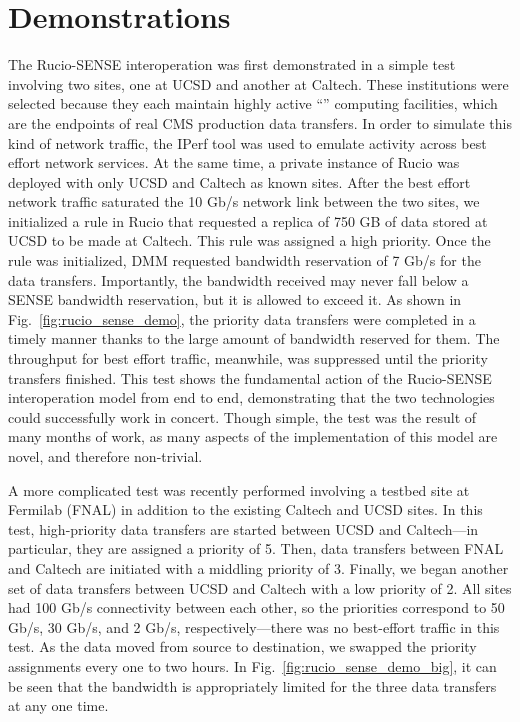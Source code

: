 \section{Demonstrations}
The Rucio-SENSE interoperation was first demonstrated in a simple test involving two sites, one at UCSD and another at Caltech. 
These institutions were selected because they each maintain highly active ``'' computing facilities, which are the endpoints of real CMS production data transfers. 
In order to simulate this kind of network traffic, the IPerf tool was used to emulate activity across best effort network services. 
At the same time, a private instance of Rucio was deployed with only UCSD and Caltech as known sites. 
After the best effort network traffic saturated the 10 Gb/s network link between the two sites, we initialized a rule in Rucio that requested a replica of 750 GB of data stored at UCSD to be made at Caltech. 
This rule was assigned a high priority. 
Once the rule was initialized, DMM requested bandwidth reservation of 7 Gb/s for the data transfers. 
Importantly, the bandwidth received may never fall below a SENSE bandwidth reservation, but it is allowed to exceed it. 
As shown in Fig.~\ref{fig:rucio_sense_demo}, the priority data transfers were completed in a timely manner thanks to the large amount of bandwidth reserved for them. 
The throughput for best effort traffic, meanwhile, was suppressed until the priority transfers finished. 
This test shows the fundamental action of the Rucio-SENSE interoperation model from end to end, demonstrating that the two technologies could successfully work in concert. 
Though simple, the test was the result of many months of work, as many aspects of the implementation of this model are novel, and therefore non-trivial. 

A more complicated test was recently performed involving a testbed site at Fermilab (FNAL) in addition to the existing Caltech and UCSD sites. 
In this test, high-priority data transfers are started between UCSD and Caltech---in particular, they are assigned a priority of 5. 
Then, data transfers between FNAL and Caltech are initiated with a middling priority of 3. 
Finally, we began another set of data transfers between UCSD and Caltech with a low priority of 2. 
All sites had 100 Gb/s connectivity between each other, so the priorities correspond to 50 Gb/s, 30 Gb/s, and 2 Gb/s, respectively---there was no best-effort traffic in this test. 
As the data moved from source to destination, we swapped the priority assignments every one to two hours. 
In Fig.~\ref{fig:rucio_sense_demo_big}, it can be seen that the bandwidth is appropriately limited for the three data transfers at any one time. 

